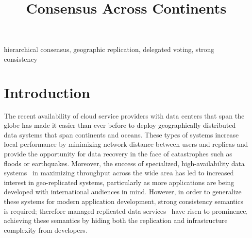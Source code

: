 \documentclass[11pt,conference]{IEEEtran}
\begin{document}
\title{Consensus Across Continents}

\author{
}

\maketitle

\begin{abstract}
    
\end{abstract}

\begin{IEEEkeywords}
hierarchical consensus, geographic replication, delegated voting, strong consistency
\end{IEEEkeywords}

\section{Introduction}

The recent availability of cloud service providers with data centers that span the globe
has made it easier than ever before to deploy geographically distributed data systems
that span continents and oceans.
These types of systems increase local performance by minimizing network distance between
users and replicas and provide the opportunity for data recovery in the face of
catastrophes such as floods or earthquakes.
Moreover, the success of specialized, high-availability data
systems~\cite{megastore,tao,akkio,dynamic_placement} in maximizing throughput across the
wide area has led to increased interest in geo-replicated systems, particularly as more
applications are being developed with international audiences in mind.
However, in order to generalize these systems for modern application development, strong
consistency semantics is required; therefore managed replicated data
services~\cite{spanner,aurora,cockroachdb} have risen to prominence, achieving these
semantics by hiding both the replication and infrastructure complexity from developers.
\end{document}
